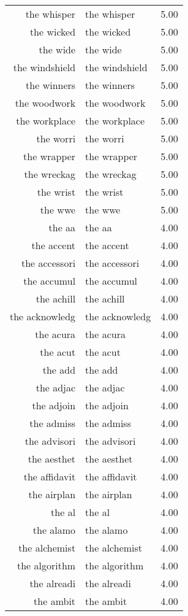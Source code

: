 \begin{table}[ht]
\begin{tabular}{rlr}
  the whisper & the whisper & 5.00 \\ 
  the wicked & the wicked & 5.00 \\ 
  the wide & the wide & 5.00 \\ 
  the windshield & the windshield & 5.00 \\ 
  the winners & the winners & 5.00 \\ 
  the woodwork & the woodwork & 5.00 \\ 
  the workplace & the workplace & 5.00 \\ 
  the worri & the worri & 5.00 \\ 
  the wrapper & the wrapper & 5.00 \\ 
  the wreckag & the wreckag & 5.00 \\ 
  the wrist & the wrist & 5.00 \\ 
  the wwe & the wwe & 5.00 \\ 
  the aa & the aa & 4.00 \\ 
  the accent & the accent & 4.00 \\ 
  the accessori & the accessori & 4.00 \\ 
  the accumul & the accumul & 4.00 \\ 
  the achill & the achill & 4.00 \\ 
  the acknowledg & the acknowledg & 4.00 \\ 
  the acura & the acura & 4.00 \\ 
  the acut & the acut & 4.00 \\ 
  the add & the add & 4.00 \\ 
  the adjac & the adjac & 4.00 \\ 
  the adjoin & the adjoin & 4.00 \\ 
  the admiss & the admiss & 4.00 \\ 
  the advisori & the advisori & 4.00 \\ 
  the aesthet & the aesthet & 4.00 \\ 
  the affidavit & the affidavit & 4.00 \\ 
  the airplan & the airplan & 4.00 \\ 
  the al & the al & 4.00 \\ 
  the alamo & the alamo & 4.00 \\ 
  the alchemist & the alchemist & 4.00 \\ 
  the algorithm & the algorithm & 4.00 \\ 
  the alreadi & the alreadi & 4.00 \\ 
  the ambit & the ambit & 4.00 \\ 

\end{tabular}
\end{table}
